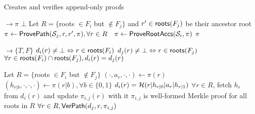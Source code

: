 \begin{algorithm}[H]%
    \caption{\small Creates and verifies append-only proofs}
    \label{a:aas:proveappendonly}
    \label{a:aas:verappendonly}
    \footnotesize
    \begin{algorithmic}[1]
     $\rightarrow \pi$
            \Return $\bot$
        \EndIf
        \State Let $R=\{$roots $\in F_i$ but $\not\in F_j\}$ and $r'\in \mathsf{roots}(F_j)$ be their ancestor root
        \State $\pi\gets \mathsf{ProvePath}(\mathcal{S}_j, r,r',\pi), \forall r \in R\quad \pi\gets\mathsf{ProveRootAccs}(\mathcal{S}_i,\pi)$
        \State \Return $\pi$
    \EndFunction

     $\rightarrow \{T,F\}$
        \Assert $d_i(r) \ne \bot \Leftrightarrow r\in \mathsf{roots}(F_i)$ 
        \label{a:aas:verappendonly:check-digest-begin}
        \Assert $d_j(r) \ne \bot \Leftrightarrow r\in \mathsf{roots}(F_j)$ 
        \label{a:aas:verappendonly:check-digest-end}
        \Assert $\forall r \in \mathsf{roots}(F_i) \cap \mathsf{roots}(F_j), d_i(r)=d_j(r)$
        
        \State Let $R=\{$roots $\in F_i$ but $\not\in F_j\}$ 
         
            \label{a:aas:verappendonly:check-old-root-accs-begin}
            \State $(\cdot,a_{r},\cdot,\cdot)\gets \pi(r)$ \quad $({h}_{r|b},\cdot,\cdot,\cdot) \gets \pi(r|b),\forall b\in \{0,1\}$
            \Assert $d_i(r) = \mathcal{H}(r|h_{r|0}|a_r|h_{r|1})$
        \EndFor
        \label{a:aas:verappendonly:check-old-root-accs-end}
        \State $\forall r\in R$, fetch $h_r$ from $d_i(r)$ and update $\pi_{i,j}(r)$ with it
        \Assert $\pi_{i,j}$ is well-formed Merkle proof for all roots in $R$
        \Assert $\forall r\in R,\mathsf{VerPath}(d_j, r, \pi_{i,j})$
        \label{a:aas:verappendonly:paths}
    \EndFunction
    \end{algorithmic}
\end{algorithm}

